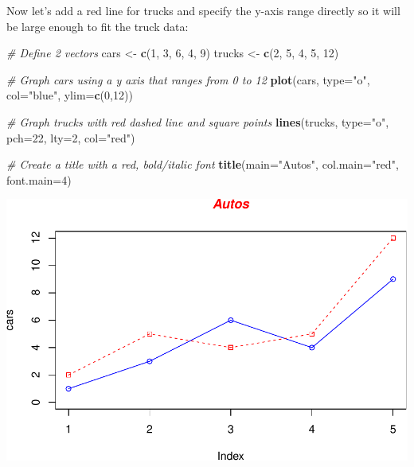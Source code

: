 \documentclass[]{book}
\makeatletter
\newenvironment{Shaded}{\begin{snugshade}}{\end{snugshade}}
\newcommand{\CommentTok}[1]{\textcolor[rgb]{0.56,0.35,0.01}{\textit{#1}}}
\newcommand{\DataTypeTok}[1]{\textcolor[rgb]{0.13,0.29,0.53}{#1}}
\newcommand{\DecValTok}[1]{\textcolor[rgb]{0.00,0.00,0.81}{#1}}
\newcommand{\KeywordTok}[1]{\textcolor[rgb]{0.13,0.29,0.53}{\textbf{#1}}}
\newcommand{\NormalTok}[1]{#1}
\newcommand{\StringTok}[1]{\textcolor[rgb]{0.31,0.60,0.02}{#1}}
\newenvironment{kframe}{%
\medskip{}
\setlength{\fboxsep}{.8em}
 \def\at@end@of@kframe{}%
 \ifinner\ifhmode%
  \def\at@end@of@kframe{\end{minipage}}%
  \begin{minipage}{\columnwidth}%
 \fi\fi%
 \def\FrameCommand##1{\hskip\@totalleftmargin \hskip-\fboxsep
 \colorbox{shadecolor}{##1}\hskip-\fboxsep
     \hskip-\linewidth \hskip-\@totalleftmargin \hskip\columnwidth}%
 \MakeFramed {\advance\hsize-\width
   \@totalleftmargin\z@ \linewidth\hsize
   \@setminipage}}%
 {\par\unskip\endMakeFramed%
 \at@end@of@kframe}
\renewenvironment{Shaded}{\begin{kframe}}{\end{kframe}}
\makeatother
\begin{document}
Now let's add a red line for trucks and specify the y-axis range directly so it will be large enough to fit the truck data:

\begin{Shaded}
\begin{Highlighting}[]
\CommentTok{# Define 2 vectors}
\NormalTok{cars <-}\StringTok{ }\KeywordTok{c}\NormalTok{(}\DecValTok{1}\NormalTok{, }\DecValTok{3}\NormalTok{, }\DecValTok{6}\NormalTok{, }\DecValTok{4}\NormalTok{, }\DecValTok{9}\NormalTok{)}
\NormalTok{trucks <-}\StringTok{ }\KeywordTok{c}\NormalTok{(}\DecValTok{2}\NormalTok{, }\DecValTok{5}\NormalTok{, }\DecValTok{4}\NormalTok{, }\DecValTok{5}\NormalTok{, }\DecValTok{12}\NormalTok{)}

\CommentTok{# Graph cars using a y axis that ranges from 0 to 12}
\KeywordTok{plot}\NormalTok{(cars, }\DataTypeTok{type=}\StringTok{"o"}\NormalTok{, }\DataTypeTok{col=}\StringTok{"blue"}\NormalTok{, }\DataTypeTok{ylim=}\KeywordTok{c}\NormalTok{(}\DecValTok{0}\NormalTok{,}\DecValTok{12}\NormalTok{))}

\CommentTok{# Graph trucks with red dashed line and square points}
\KeywordTok{lines}\NormalTok{(trucks, }\DataTypeTok{type=}\StringTok{"o"}\NormalTok{, }\DataTypeTok{pch=}\DecValTok{22}\NormalTok{, }\DataTypeTok{lty=}\DecValTok{2}\NormalTok{, }\DataTypeTok{col=}\StringTok{"red"}\NormalTok{)}

\CommentTok{# Create a title with a red, bold/italic font}
\KeywordTok{title}\NormalTok{(}\DataTypeTok{main=}\StringTok{"Autos"}\NormalTok{, }\DataTypeTok{col.main=}\StringTok{"red"}\NormalTok{, }\DataTypeTok{font.main=}\DecValTok{4}\NormalTok{)}
\end{Highlighting}
\end{Shaded}

\includegraphics{bioinfBookXIE186_files/figure-latex/unnamed-chunk-94-1.pdf}
\end{document}
